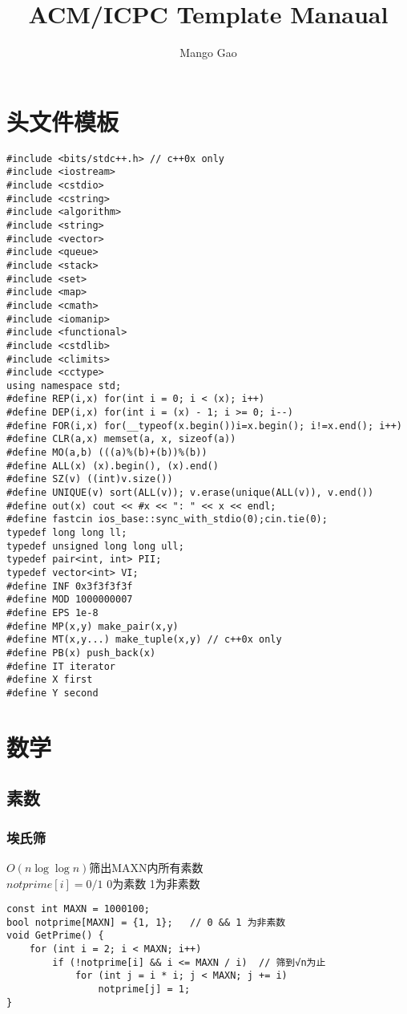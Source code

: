 \documentclass[a4paper]{article}
\title{ACM/ICPC Template Manaual}
\author{Mango Gao}
\begin{document}
\begin{titlepage}
\maketitle
\end{titlepage}
\clearpage
\tableofcontents
\clearpage
\section{头文件模板}
\begin{lstlisting}
#include <bits/stdc++.h> // c++0x only
#include <iostream>
#include <cstdio>
#include <cstring>
#include <algorithm>
#include <string>
#include <vector>
#include <queue>
#include <stack>
#include <set>
#include <map>
#include <cmath>
#include <iomanip>
#include <functional>
#include <cstdlib>
#include <climits>
#include <cctype>
using namespace std;
#define REP(i,x) for(int i = 0; i < (x); i++)
#define DEP(i,x) for(int i = (x) - 1; i >= 0; i--)
#define FOR(i,x) for(__typeof(x.begin())i=x.begin(); i!=x.end(); i++)
#define CLR(a,x) memset(a, x, sizeof(a))
#define MO(a,b) (((a)%(b)+(b))%(b))
#define ALL(x) (x).begin(), (x).end()
#define SZ(v) ((int)v.size())
#define UNIQUE(v) sort(ALL(v)); v.erase(unique(ALL(v)), v.end())
#define out(x) cout << #x << ": " << x << endl;
#define fastcin ios_base::sync_with_stdio(0);cin.tie(0);
typedef long long ll;
typedef unsigned long long ull;
typedef pair<int, int> PII;
typedef vector<int> VI;
#define INF 0x3f3f3f3f
#define MOD 1000000007
#define EPS 1e-8
#define MP(x,y) make_pair(x,y)
#define MT(x,y...) make_tuple(x,y) // c++0x only
#define PB(x) push_back(x)
#define IT iterator
#define X first
#define Y second
\end{lstlisting}
\clearpage
\section{数学}
\subsection{素数}
\subsubsection{埃氏筛}
$O(n\log\log n)$筛出MAXN内所有素数 \\
$notprime[i] = 0/1$ 0为素数 1为非素数\begin{lstlisting}
const int MAXN = 1000100;
bool notprime[MAXN] = {1, 1};	// 0 && 1 为非素数
void GetPrime() {
	for (int i = 2; i < MAXN; i++)
		if (!notprime[i] && i <= MAXN / i)	// 筛到√n为止
			for (int j = i * i; j < MAXN; j += i)
				notprime[j] = 1;
}
\end{lstlisting}
\end{document}
